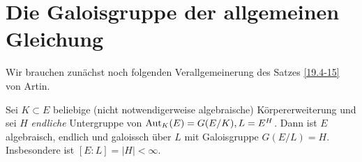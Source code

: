 \section{Die Galoisgruppe der allgemeinen Gleichung}

Wir brauchen zunächst noch folgenden Verallgemeinerung des Satzes \ref{19.4-15} von Artin.

\begin{st} \label{20.4-1}
	Sei $K \subset E$ beliebige (nicht notwendigerweise algebraische) Körpererweiterung und sei $H$ \emph{endliche} Untergruppe von $\operatorname{Aut}_K(E) = G(E / K), L = E^H$.
	Dann ist $E$ algebraisch, endlich und galoissch über $L$ mit Galoisgruppe $G(E / L) = H$.
	Insbesondere ist $[E : L] = |H| < \infty$.
\end{st}


